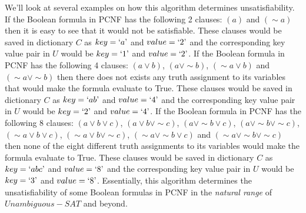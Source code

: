 \documentclass[runningheads,a4paper]{llncs}
\let\oldsim\sim
\renewcommand{\sim}{{\oldsim}}
\begin{document}
We'll look at several examples on how this algorithm determines unsatisfiability. If the Boolean formula in PCNF has the following 2 clauses: $(a)$ and $(\sim a)$ then it is easy to see that it would not be satisfiable. These clauses would be saved in dictionary $C$ as $key=`a\textrm'$ and $value=`2\textrm'$ and the corresponding key value pair in $U$ would be $key=`1\textrm'$ and $value=`2\textrm'$. If the Boolean formula in PCNF has the following 4 clauses: $({a}\vee {b})$, $({a}\vee \sim {b})$, $(\sim {a}\vee {b})$ and $(\sim {a}\vee \sim {b})$ then there does not exists any truth assignment to its variables that would make the formula evaluate to True. These clauses would be saved in dictionary $C$ as $key=`ab\textrm'$ and $value=`4\textrm'$ and the corresponding key value pair in $U$ would be $key=`2\textrm'$ and $value=`4\textrm'$. If the Boolean formula in PCNF has the following 8 clauses: $({a}\vee {b} \vee {c})$, $({a}\vee {b} \vee \sim {c})$, $({a}\vee \sim {b} \vee {c})$, $({a}\vee \sim {b} \vee \sim {c})$, $(\sim {a}\vee {b} \vee {c})$, $(\sim {a}\vee {b} \vee \sim {c})$, $( \sim {a}\vee \sim {b} \vee {c})$ and $( \sim {a}\vee \sim {b} \vee \sim {c})$ then none of the eight different truth assignments to its variables would make the formula evaluate to True. These clauses would be saved in dictionary $C$ as $key=`abc\textrm'$ and $value=`8\textrm'$ and the corresponding key value pair in $U$ would be $key=`3\textrm'$ and $value=`8\textrm'$. Essentially, this algorithm determines the unsatisfiability of some Boolean formulas in PCNF in the \emph{natural range} of ${Unambiguous-SAT}$ and beyond. 
 
\end{document}
